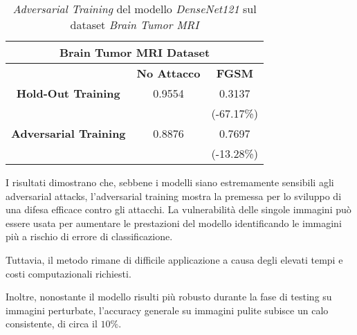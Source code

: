     \begin{table}[!h]
        \centering
        \begin{tabular}{|c||c|c|}
            \hline
            \multicolumn{3}{|c|}{\textbf{Brain Tumor MRI Dataset}} \rule[-3mm]{0mm}{8mm}\\
            \hline
            \rule[-3mm]{0mm}{8mm}
            & \textbf{No Attacco} & \textbf{FGSM}\\
            \hline \hline
            \rule[-3mm]{0mm}{8mm}
            \textbf{Hold-Out Training}      & 0.9554 & 0.3137 \\
             & & (-67.17\%) \\
            \hline
            \rule[-3mm]{0mm}{8mm}
            \textbf{Adversarial Training }  & 0.8876 & 0.7697 \\
             & & (-13.28\%) \\
            \hline
        \end{tabular}
        \caption{\textit{Adversarial Training} del modello \textit{DenseNet121} sul dataset \textit{Brain Tumor MRI}}
        \label{Adversarial Training Brain Tumor MRI}
    \end{table}
    
I risultati dimostrano che, sebbene i modelli siano estremamente sensibili agli adversarial attacks, l'adversarial training mostra la premessa per lo sviluppo di una difesa efficace contro gli attacchi. La vulnerabilità delle singole immagini può essere usata per aumentare le prestazioni del modello identificando le immagini più a rischio di errore di classificazione.

Tuttavia, il metodo rimane di difficile applicazione a causa degli elevati tempi e costi computazionali richiesti.

Inoltre, nonostante il modello risulti più robusto durante la fase di testing su immagini perturbate, l'accuracy generale su immagini pulite subisce un calo consistente, di circa il $10\%$.

\newpage
